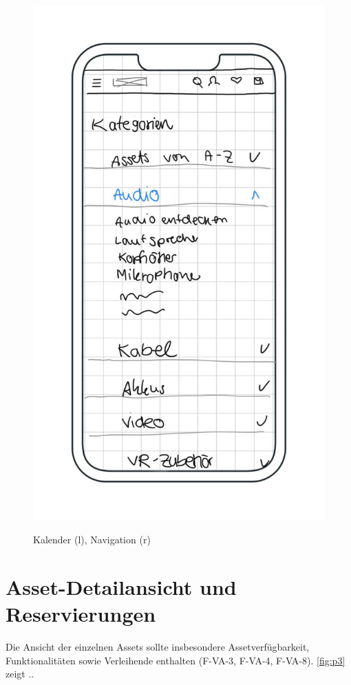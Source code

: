 \begin{figure}[h]
    \includegraphics[scale=0.37]{Bilder/Mockups/Kategorien.jpg}
    \label{fig:kalender}
\caption[Kalenderkomponente]{Kalender (l), Navigation (r)}
\end{figure}


\section{Asset-Detailansicht und Reservierungen}
Die Ansicht der einzelnen Assets sollte insbesondere Assetverfügbarkeit, Funktionalitäten sowie
Verleihende enthalten (F-VA-3, F-VA-4, F-VA-8). \ref{fig:p3} zeigt ..

